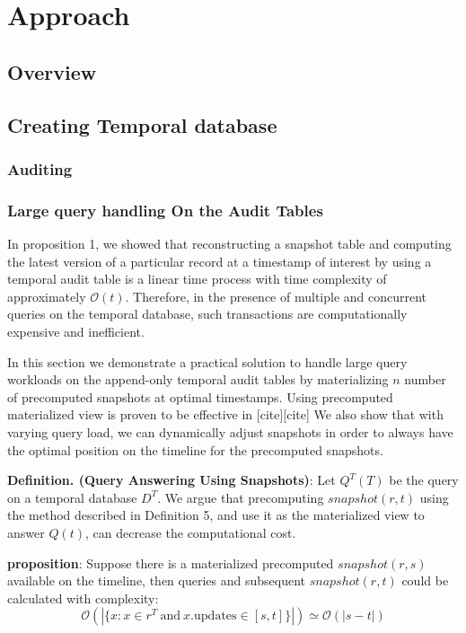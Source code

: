 \chapter{Approach}
\label{chap:approach}

\section{Overview}
\section{Creating Temporal database}
\subsection{Auditing}
\subsection{Large query handling On the Audit Tables}
In proposition 1, we showed that reconstructing a snapshot table and computing the latest version of a particular record at a timestamp of interest by using a temporal audit table is a linear time process with time complexity of approximately $\mathcal{O}(t)$. Therefore, in the presence of multiple and concurrent queries on the temporal database, such transactions are computationally expensive and inefficient.

In this section we demonstrate a practical solution to handle large query workloads on the append-only temporal audit tables by materializing $n$ number of precomputed snapshots at optimal timestamps. Using precomputed materialized view is proven to be effective in [cite][cite] We also show that with varying query load, we can dynamically adjust snapshots in order to always have the optimal position on the timeline for the precomputed snapshots.

\textbf{Definition. (Query Answering Using Snapshots)}: Let $Q^T(T)$ be the query on a temporal database $D^T$. We argue that precomputing $snapshot(r,t)$ using the method described in Definition 5, and use it as the materialized view to answer $Q(t)$, can decrease the computational cost.

\textbf{proposition}: Suppose there is a materialized precomputed $snapshot(r,s)$ available on the timeline, then queries and subsequent $snapshot(r,t)$ could be calculated with complexity:
$$\mathcal{O}(|\{x: x\in r^T\mathrm{\ and\ } x.\mathrm{updates} \in [s,
t]\}|) \simeq \mathcal{O}(|s-t|)$$

